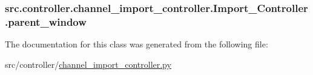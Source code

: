 \subsubsection[{parent\+\_\+window}]{\setlength{\rightskip}{0pt plus 5cm}src.\+controller.\+channel\+\_\+import\+\_\+controller.\+Import\+\_\+\+Controller.\+parent\+\_\+window}\label{classsrc_1_1controller_1_1channel__import__controller_1_1Import__Controller_ad7945e37509da3a09ae56a2750a600a2}


The documentation for this class was generated from the following file\+:\begin{DoxyCompactItemize}
\item 
src/controller/\hyperlink{channel__import__controller_8py}{channel\+\_\+import\+\_\+controller.\+py}\end{DoxyCompactItemize}
